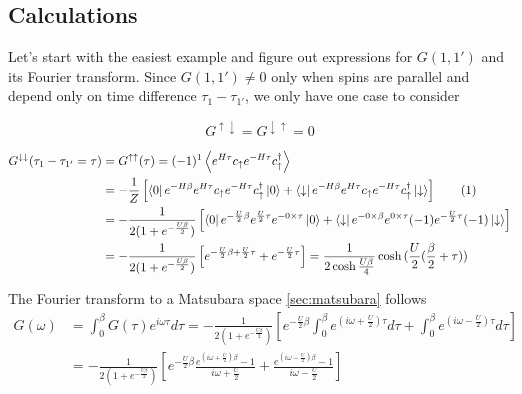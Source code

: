 \subsection{Calculations}
Let's start with the easiest example and figure out expressions for $G(1,1')$ and its Fourier transform.
Since $G(1,1')\neq0$ only when spins are parallel and depend only on time difference $\tau_1-\tau_{1'}$, we only have one case to consider

\begin{equation}
 G^{\uparrow\downarrow} = G^{\downarrow\uparrow} = 0
\end{equation}

\begin{align*}
 \label{Gamma2}
 \stepcounter{equation}
 G^{\downarrow\downarrow}(\tau_1-\tau_{1'}=\tau) & = G^{\uparrow\uparrow}(\tau) = (-1)^1\left\langle e^{H\tau} c_\uparrow e^{-H\tau} c_\uparrow^\dagger\right\rangle \\
  & = 
  -\frac{1}{Z}\left[
    \bra{0}e^{-H\beta}e^{H\tau}c_\uparrow e^{-H\tau} c_\uparrow^\dagger\ket{0} +
    \bra{\downarrow}e^{-H\beta}e^{H\tau}c_\uparrow e^{-H\tau} c_\uparrow^\dagger\ket{\downarrow}
  \right] \tag{\theequation} \\
  & = -\frac{1}{2(1+e^{-\frac{U\beta}{2}})}\left[ 
    \bra{0}e^{-\frac{U}{2}\beta}e^{\frac{U}{2}\tau}e^{-0\times\tau}\ket{0} +
    \bra{\downarrow}e^{-0\times\beta}e^{0\times\tau}(-1)e^{-\frac{U}{2}\tau}(-1)\ket{\downarrow}
  \right] \\
  & = -\frac{1}{2(1+e^{-\frac{U\beta}{2}})}\left[
    e^{-\frac{U}{2}\beta+\frac{U}{2}\tau} + e^{-\frac{U}{2}\tau}
  \right] = \frac{1}{2\cosh{\frac{U\beta}{4}}}\cosh{(\frac{U}{2}(\frac{\beta}{2}+\tau))}
\end{align*}

The Fourier transform to a Matsubara space \autoref{sec:matsubara} follows
\begin{equation}\begin{aligned}
 G(\omega) & = \int_0^\beta G(\tau) e^{i\omega\tau} d\tau
  = -\frac{1}{2(1+e^{-\frac{U\beta}{2}})}\left[ 
    e^{-\frac{U}{2}\beta}\int_0^\beta  e^{(i\omega+\frac{U}{2})\tau} d\tau + \int_0^\beta  e^{(i\omega-\frac{U}{2})\tau} d\tau
  \right] \\
 & = -\frac{1}{2(1+e^{-\frac{U\beta}{2}})}\left[
    e^{-\frac{U}{2}\beta} \frac{e^{(i\omega+\frac{U}{2})\beta}-1}{i\omega+\frac{U}{2}} + \frac{e^{(i\omega-\frac{U}{2})\beta}-1}{i\omega-\frac{U}{2}}
  \right]
\end{aligned}\end{equation}

